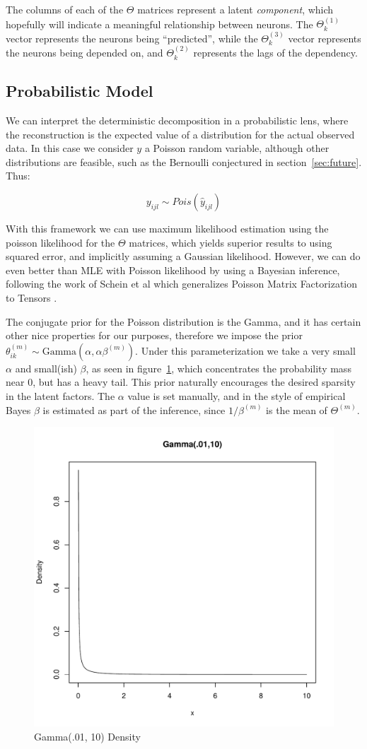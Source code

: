 \documentclass{article}
\begin{document}
The columns of each of the $\Theta$ matrices represent a latent \textit{component}, which hopefully will indicate a meaningful relationship between neurons. 
The $\Theta^{(1)}_k$ vector represents the neurons being ``predicted'',
while the $\Theta^{(3)}_k$ vector represents the neurons being depended on, and 
$\Theta^{(2)}_k$ represents the lags of the dependency.


\subsection{Probabilistic Model}
\label{sec:bayesian}
We can interpret the deterministic decomposition in a probabilistic lens, where the reconstruction is the expected value of a distribution for the actual observed data. In this case we consider $y$ a Poisson random variable, although other distributions are feasible, such as the Bernoulli conjectured in section~\ref{sec:future}. Thus:

$$y_{ijl} \sim Pois(\hat{y}_{ijl})$$

With this framework we can use maximum likelihood estimation using the poisson likelihood for the $\Theta$ matrices, which yields superior results to using squared error, and implicitly assuming a Gaussian likelihood. However, we can do even better than MLE with Poisson likelihood by using a Bayesian inference, following the work of Schein et al which generalizes Poisson Matrix Factorization to Tensors \cite{cemgil2009bayesian,schein2015bayesian,ermics2015link}. 

The conjugate prior for the Poisson distribution is the Gamma, and it has certain other nice properties for our purposes, therefore we impose the prior $\theta_{ik}^{(m)} \sim \textrm{Gamma}(\alpha, \alpha \beta^{(m)})$. Under this parameterization we take a very small $\alpha$ and small(ish) $\beta$, as seen in figure~\ref{fig:gamma}, which concentrates the probability mass near 0, but has a heavy tail. This prior naturally encourages the desired sparsity in the latent factors. The $\alpha$ value is set manually, and in the style of empirical Bayes $\beta$ is estimated as part of the inference, since $1/\beta^{(m)}$ is the mean of $\Theta^{(m)}$. 

\begin{figure}[!b]
\centering
\includegraphics[width=.5\linewidth]{gamma}
\caption{Gamma(.01, 10) Density}
\label{fig:gamma}
\end{figure}
\end{document}
